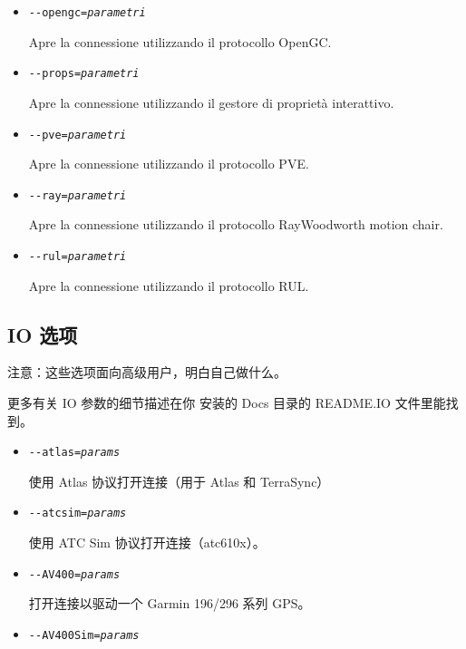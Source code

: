 \begin{itemize}
{\begin{itemize}
  \item{\texttt{-$ $-opengc={\it parametri}}}

    Apre la connessione utilizzando il protocollo OpenGC.

  \item{\texttt{-$ $-props={\it parametri}}}

    Apre la connessione utilizzando il gestore di propriet\`{a} interattivo.

  \item{\texttt{-$ $-pve={\it parametri}}}

    Apre la connessione utilizzando il protocollo PVE.

  \item{\texttt{-$ $-ray={\it parametri}}}

    Apre la connessione utilizzando il protocollo RayWoodworth motion chair.

  \item{\texttt{-$ $-rul={\it parametri}}}

    Apre la connessione utilizzando il protocollo RUL.

  \end{itemize}
}
\ifchinese
{
  \subsection{IO 选项}
注意：这些选项面向高级用户，明白自己做什么。

更多有关 IO 参数的细节描述在你 \FlightGear{} 安装的 Docs 目录的 README.IO 文件里能找到。

\begin{itemize}

  \item{\texttt{-$ $-atlas={\it params}}}

  使用 Atlas 协议打开连接（用于 Atlas 和 TerraSync）

 \item{\texttt{-$ $-atcsim={\it params}}}

  使用 ATC Sim 协议打开连接（atc610x）。

 \item{\texttt{-$ $-AV400={\it params}}}

  打开连接以驱动一个 Garmin 196/296 系列 GPS。 

 \item{\texttt{-$ $-AV400Sim={\it params}}}


\end{itemize}}
\end{itemize}
